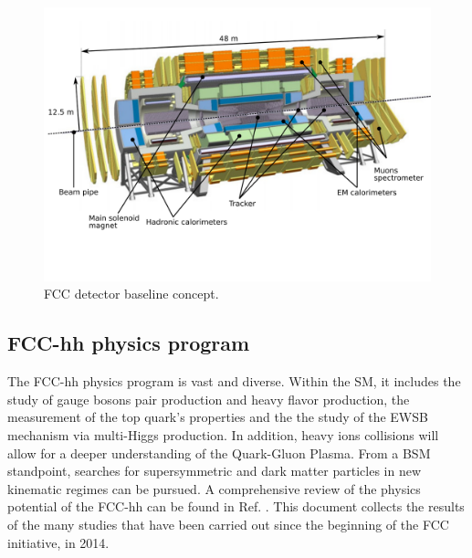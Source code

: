 \begin{figure}
	\centering
	\includegraphics[trim={0 4cm 0.5cm 0},clip,width=\textwidth]{./Figures/FCCsvg1.png}
	\caption{FCC detector baseline concept.}
	\label{fig:FCC_detector}
\end{figure} 


\subsection{FCC-hh physics program}

The FCC-hh physics program is vast and diverse. Within the SM, it includes the study of gauge bosons pair production and heavy flavor production, the measurement of the top quark's properties and the the study of the EWSB mechanism via multi-Higgs production. In addition, heavy ions collisions will allow for a deeper understanding of the Quark-Gluon Plasma. From a BSM standpoint, searches for supersymmetric and dark matter particles in new kinematic regimes can be pursued. A comprehensive review of the physics potential of the FCC-hh can be found in Ref. \cite{FCCyellow}. This document collects the results of the many studies that have been carried out since the beginning of the FCC initiative, in 2014.

